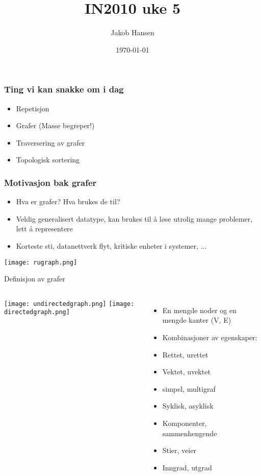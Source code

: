 \documentclass[norsk, handout]{beamer}
\title{IN2010 uke 5}
\author{Jakob Hansen}
\date{\today}
\begin{document}
	\frame{\titlepage}
    \begin{frame}
		\frametitle{Ting vi kan snakke om i dag}
		\begin{itemize}
			\item Repetisjon
			\item Grafer (Masse begreper!)
			\item Traversering av grafer
			\item Topologisk sortering
		\end{itemize}
    \end{frame}

	\begin{frame}
		\frametitle{Motivasjon bak grafer}

		\begin{itemize}
			\item Hva er grafer? Hva brukes de til?
				\pause
			\item Veldig generalisert datatype, kan brukes til å løse utrolig mange
				problemer, lett å representere
			\item Korteste sti, datanettverk flyt, kritiske enheter i systemer, ...
		\end{itemize}
		\begin{center}
			\texttt{[image: rugraph.png]}
		\end{center}
	\end{frame}

	\begin{frame}{Definisjon av grafer}
			\begin{columns}[onlytextwidth,T]
				\column{0.45\textwidth}
				\texttt{[image: undirectedgraph.png]}
				\texttt{[image: directedgraph.png]}

				\column{0.55\textwidth}
				\begin{itemize}
					\item En mengde noder og en mengde kanter (V, E)
						\pause
					\item Kombinasjoner av egenskaper:
					\item Rettet, urettet
						\pause
					\item Vektet, uvektet
						\pause
					\item simpel, multigraf
						\pause
					\item Syklisk, asyklisk
						\pause
					\item Komponenter, sammenhengende
						\pause
					\item Stier, veier
						\pause
					\item Inngrad, utgrad
				\end{itemize}
			\end{columns}

	\end{frame}
\end{document}
